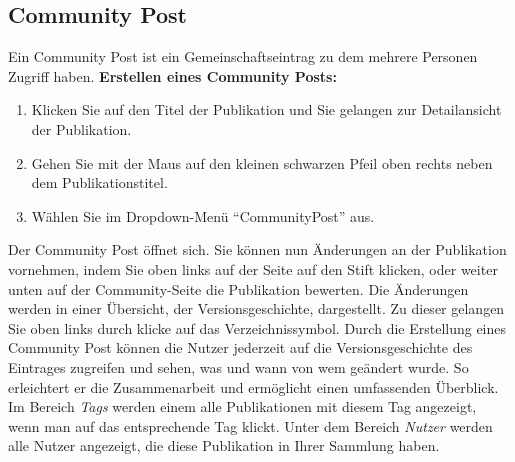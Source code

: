 \documentclass[b5paper,11pt,twoside]{scrbook} %
\begin{document}
\subsection{Community Post}
Ein Community Post ist ein Gemeinschaftseintrag zu dem mehrere Personen Zugriff haben. \newline \newline
\textbf{Erstellen eines Community Posts:}
\begin{enumerate}
	\item Klicken Sie auf den Titel der Publikation und Sie gelangen zur Detailansicht der Publikation. 
	\item Gehen Sie mit der Maus auf den kleinen schwarzen Pfeil oben rechts neben dem Publikationstitel. 
	\item Wählen Sie im Dropdown-Menü \enquote{CommunityPost} aus. \end{enumerate}
Der Community Post öffnet sich. Sie können nun Änderungen an der Publikation vornehmen, indem Sie oben links auf der Seite auf den Stift klicken, oder weiter unten auf der Community-Seite die Publikation bewerten. Die Änderungen werden in einer Übersicht, der Versionsgeschichte, dargestellt. Zu dieser gelangen Sie oben links durch klicke auf das Verzeichnissymbol.\newline
Durch die Erstellung eines Community Post können die Nutzer jederzeit auf die Versionsgeschichte des Eintrages zugreifen und sehen, was und wann von wem geändert wurde. So erleichtert er die Zusammenarbeit und ermöglicht einen umfassenden Überblick. \newline
Im Bereich \textit{Tags} werden einem alle Publikationen mit diesem Tag angezeigt, wenn man auf das entsprechende Tag klickt. \newline
Unter dem Bereich \textit{Nutzer} werden alle Nutzer angezeigt, die diese Publikation in Ihrer Sammlung haben.






\end{document}
